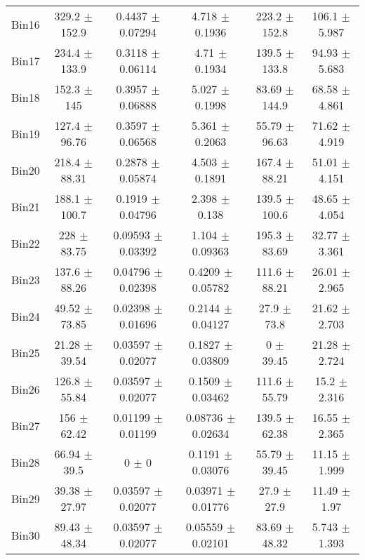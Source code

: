\begin{tabular}{@{\extracolsep{4pt}}lccccc@{}}
     Bin16 & 329.2 $\pm$ 152.9 & 0.4437 $\pm$ 0.07294 & 4.718 $\pm$ 0.1936 & 223.2 $\pm$ 152.8 & 106.1 $\pm$ 5.987 \\ 
     Bin17 & 234.4 $\pm$ 133.9 & 0.3118 $\pm$ 0.06114 & 4.71 $\pm$ 0.1934 & 139.5 $\pm$ 133.8 & 94.93 $\pm$ 5.683 \\ 
     Bin18 & 152.3 $\pm$ 145 & 0.3957 $\pm$ 0.06888 & 5.027 $\pm$ 0.1998 & 83.69 $\pm$ 144.9 & 68.58 $\pm$ 4.861 \\ 
     Bin19 & 127.4 $\pm$ 96.76 & 0.3597 $\pm$ 0.06568 & 5.361 $\pm$ 0.2063 & 55.79 $\pm$ 96.63 & 71.62 $\pm$ 4.919 \\ 
     Bin20 & 218.4 $\pm$ 88.31 & 0.2878 $\pm$ 0.05874 & 4.503 $\pm$ 0.1891 & 167.4 $\pm$ 88.21 & 51.01 $\pm$ 4.151 \\ 
     Bin21 & 188.1 $\pm$ 100.7 & 0.1919 $\pm$ 0.04796 & 2.398 $\pm$ 0.138 & 139.5 $\pm$ 100.6 & 48.65 $\pm$ 4.054 \\ 
     Bin22 & 228 $\pm$ 83.75 & 0.09593 $\pm$ 0.03392 & 1.104 $\pm$ 0.09363 & 195.3 $\pm$ 83.69 & 32.77 $\pm$ 3.361 \\ 
     Bin23 & 137.6 $\pm$ 88.26 & 0.04796 $\pm$ 0.02398 & 0.4209 $\pm$ 0.05782 & 111.6 $\pm$ 88.21 & 26.01 $\pm$ 2.965 \\ 
     Bin24 & 49.52 $\pm$ 73.85 & 0.02398 $\pm$ 0.01696 & 0.2144 $\pm$ 0.04127 & 27.9 $\pm$ 73.8 & 21.62 $\pm$ 2.703 \\ 
     Bin25 & 21.28 $\pm$ 39.54 & 0.03597 $\pm$ 0.02077 & 0.1827 $\pm$ 0.03809 & 0 $\pm$ 39.45 & 21.28 $\pm$ 2.724 \\ 
     Bin26 & 126.8 $\pm$ 55.84 & 0.03597 $\pm$ 0.02077 & 0.1509 $\pm$ 0.03462 & 111.6 $\pm$ 55.79 & 15.2 $\pm$ 2.316 \\ 
     Bin27 & 156 $\pm$ 62.42 & 0.01199 $\pm$ 0.01199 & 0.08736 $\pm$ 0.02634 & 139.5 $\pm$ 62.38 & 16.55 $\pm$ 2.365 \\ 
     Bin28 & 66.94 $\pm$ 39.5 & 0 $\pm$ 0 & 0.1191 $\pm$ 0.03076 & 55.79 $\pm$ 39.45 & 11.15 $\pm$ 1.999 \\ 
     Bin29 & 39.38 $\pm$ 27.97 & 0.03597 $\pm$ 0.02077 & 0.03971 $\pm$ 0.01776 & 27.9 $\pm$ 27.9 & 11.49 $\pm$ 1.97 \\ 
     Bin30 & 89.43 $\pm$ 48.34 & 0.03597 $\pm$ 0.02077 & 0.05559 $\pm$ 0.02101 & 83.69 $\pm$ 48.32 & 5.743 $\pm$ 1.393 \\ 
\hline\hline
  \end{tabular}
